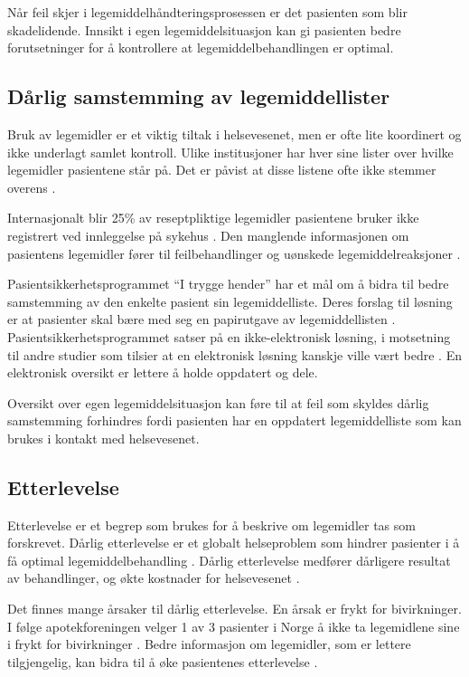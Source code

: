 Når feil skjer i legemiddelhåndteringsprosessen er det pasienten som blir skadelidende. Innsikt i egen legemiddelsituasjon kan gi pasienten bedre forutsetninger for å kontrollere at legemiddelbehandlingen er optimal. 

\subsection*{Dårlig samstemming av legemiddellister}
Bruk av legemidler er et viktig tiltak i helsevesenet, men er ofte lite koordinert og ikke underlagt samlet kontroll. Ulike institusjoner har hver sine lister over hvilke legemidler pasientene står på. Det er påvist at disse listene ofte ikke stemmer overens \citep{vetFast}. 

Internasjonalt blir 25\% av reseptpliktige legemidler pasientene bruker ikke registrert ved innleggelse på sykehus \citep{BCP:BCP204}. Den manglende informasjonen om pasientens legemidler fører til feilbehandlinger og uønskede legemiddelreaksjoner \citep{doi:10.1001/jama.1995.03530010049034}. 

Pasientsikkerhetsprogrammet “I trygge hender” har et mål om å bidra til bedre samstemming av den enkelte pasient sin legemiddelliste. Deres forslag til løsning er at pasienter skal bære med seg en papirutgave av legemiddellisten \citep{Pasientsikkerhetsprosjektet}. Pasientsikkerhetsprogrammet satser på en ikke-elektronisk løsning, i motsetning til andre studier som tilsier at en elektronisk løsning kanskje ville vært bedre \citep{komLegemidler}. En elektronisk oversikt er lettere å holde oppdatert og dele. 

Oversikt over egen legemiddelsituasjon kan føre til at feil som skyldes dårlig samstemming forhindres fordi pasienten har en oppdatert legemiddelliste som kan brukes i kontakt med helsevesenet.

\subsection*{Etterlevelse}
Etterlevelse er et begrep som brukes for å beskrive om legemidler tas som forskrevet. Dårlig etterlevelse er et globalt helseproblem som hindrer pasienter i å få optimal legemiddelbehandling \citep{ConcordanceAdherenceCompliance}. Dårlig etterlevelse medfører dårligere resultat av behandlinger, og økte kostnader for helsevesenet \citep{WHO}. 

Det finnes mange årsaker til dårlig etterlevelse. En årsak er frykt for bivirkninger. I følge apotekforeningen velger 1 av 3 pasienter i Norge å ikke ta legemidlene sine i frykt for bivirkninger \citep{ApotekINorge}. Bedre informasjon om legemidler, som er lettere tilgjengelig, kan bidra til å øke pasientenes etterlevelse \citep{Donovan1992507, doi:10.1056/NEJMra050100}.  

